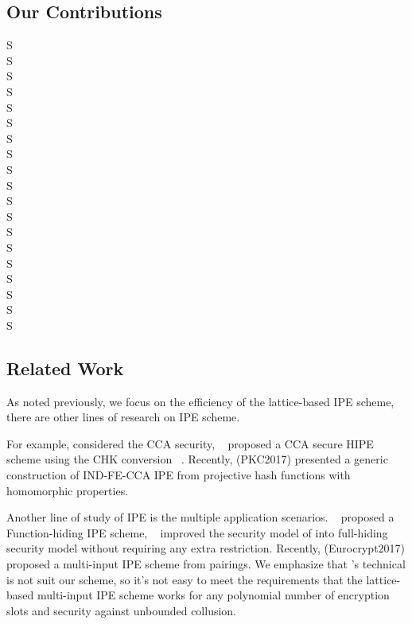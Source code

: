 \subsection{Our Contributions}
S\\
S\\
S\\
S\\
S\\
S\\
S\\
S\\
S\\
S\\
S\\
S\\
S\\
S\\
S\\
S\\
S\\
S\\
S\\








\subsection{Related Work}
As noted previously, we focus on the efficiency of the lattice-based IPE scheme, there are other lines of research on IPE scheme.\

For example, considered the CCA security, ~\cite{LC:AbdDeCMoc12} proposed a CCA secure HIPE scheme using the CHK conversion ~\cite{Boneh2007Chosen}. Recently, \cite{cryptoeprint:2017:038}(PKC2017) presented a generic construction of IND-FE-CCA IPE from projective hash functions with homomorphic properties.\

Another line of study of IPE is the multiple application scenarios. ~\cite{AC:BisJaiKow15} proposed a Function-hiding IPE scheme, ~\cite{PKC:DatDutMuk16} improved the security model of \cite{AC:BisJaiKow15} into full-hiding security model without requiring any extra restriction. Recently, \cite{cryptoeprint:2016:425}(Eurocrypt2017) proposed a multi-input IPE scheme from pairings. We emphasize that \cite{cryptoeprint:2016:425}'s technical is not suit our scheme, so it's not easy to meet the requirements that the lattice-based multi-input IPE scheme works for any polynomial number of encryption slots and security against unbounded collusion.




